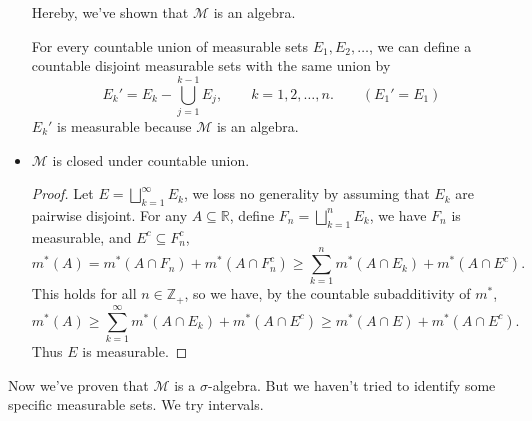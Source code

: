 \documentclass[../main.tex]{subfiles}
\begin{document}
\begin{itemize}
	\begin{remark}
	Hereby, we've shown that $\mathcal{M}$ is an algebra.

	For every countable union of measurable sets $E_1,E_2, \ldots $, we can define a countable disjoint measurable sets with the same union by
	\begin{equation*}
		E_k' = E_k - \bigcup_{j=1}^{k-1} E_j, \qquad k=1,2,\ldots ,n. \qquad (E_1'=E_1)
	\end{equation*}
	$E_k'$ is measurable because $\mathcal{M}$ is an algebra.
	\end{remark}
\item $\mathcal{M}$ is closed under countable union. 
	\begin{proof}
		Let $\displaystyle E = \bigsqcup_{k=1}^{\infty } E_k$, we loss no generality by assuming that $E_k$ are pairwise disjoint. For any $A \subseteq \mathbb{R}$, define $\displaystyle F_n = \bigsqcup_{k=1}^{n} E_k$, we have $F_n$ is measurable, and $E^c \subseteq F_n^c$,
		\begin{equation*}
		m^*(A) = m^*(A \cap F_n) + m^*(A \cap F_n^c) \geq \sum_{k=1}^{n} m^*(A \cap E_k) + m^*(A \cap E^c).
		\end{equation*}
		This holds for all $n\in \mathbb{Z}_+$, so we have, by the countable subadditivity of $m^*$,
		\begin{equation*}
			m^*(A) \geq \sum_{k=1}^{\infty } m^*(A \cap E_k) + m^*(A \cap E^c) \geq m^*(A \cap E) + m^*(A \cap E^c).
		\end{equation*}
		Thus $E$ is measurable.
	\end{proof}
\end{itemize}

\begin{remark}
Now we've proven that $\mathcal{M}$ is a $\sigma$-algebra. But we haven't tried to identify some specific measurable sets. We try intervals.
\end{remark}
\end{document}
